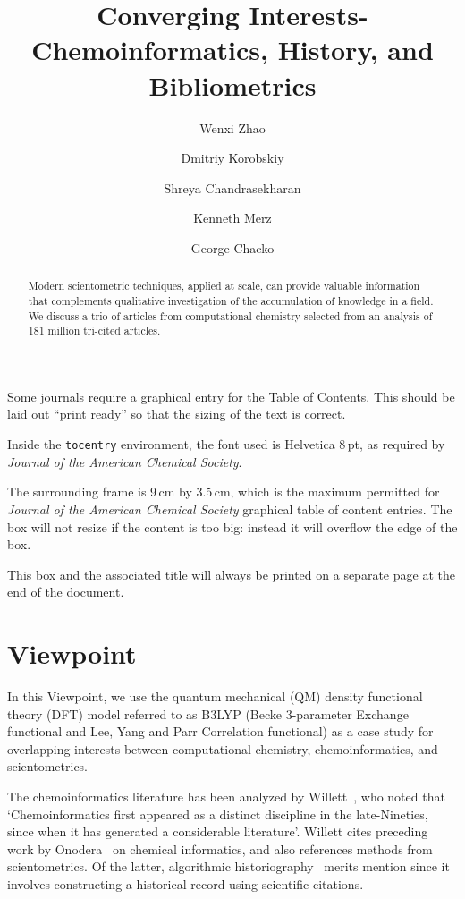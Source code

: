 \documentclass[journal=jcdis8,manuscript=article]{achemso}
\author{Wenxi Zhao}
\author{Dmitriy Korobskiy}
\author{Shreya Chandrasekharan}
\affiliation[NET ESolutions Corporation (an NTT DATA Company)]{Netelabs, NET ESolutions Corporation, VA  22102, USA}
\author{Kenneth Merz}
\affiliation[Michigan State University]{Department of Chemistry, Michigan State University, MI 48824, USA}
\author{George Chacko}
\affiliation[University of Illinois Urbana-Champaign]{Dept. of Computer Science, University of Illinois Urbana-Champaign, IL 61801, USA}
\title{Converging Interests- Chemoinformatics, History, and Bibliometrics}
\begin{document}

\begin{tocentry}
Some journals require a graphical entry for the Table of Contents.
This should be laid out ``print ready'' so that the sizing of the
text is correct.

Inside the \texttt{tocentry} environment, the font used is Helvetica
8\,pt, as required by \emph{Journal of the American Chemical
Society}.

The surrounding frame is 9\,cm by 3.5\,cm, which is the maximum
permitted for  \emph{Journal of the American Chemical Society}
graphical table of content entries. The box will not resize if the
content is too big: instead it will overflow the edge of the box.

This box and the associated title will always be printed on a
separate page at the end of the document.

\end{tocentry}

\begin{abstract}

Modern scientometric techniques, applied at scale, can provide valuable information that complements qualitative investigation of the accumulation of knowledge in a field. We discuss a trio of articles from computational chemistry selected from an analysis of 181 million tri-cited 
articles. 

\end{abstract}

\section{Viewpoint}

In this Viewpoint, we use the quantum mechanical (QM) density functional theory (DFT) model referred to as B3LYP (Becke 3-parameter Exchange functional\citep{becke1993dft} and Lee, Yang and Parr Correlation functional\citep{lyp1988}) as a case study for overlapping interests between computational chemistry, chemoinformatics, and scientometrics.

The chemoinformatics literature has been analyzed by Willett~\citep{willett2008}, who noted that  `Chemoinformatics first appeared as a distinct discipline in the late-Nineties, since when it has generated a considerable literature'. Willett cites preceding work by Onodera~\citep{onodera2003} on chemical informatics, and also references methods from scientometrics. Of the latter, algorithmic historiography~\citep{garfield2004} merits mention since it involves constructing a historical record using scientific citations. 
\end{document}
